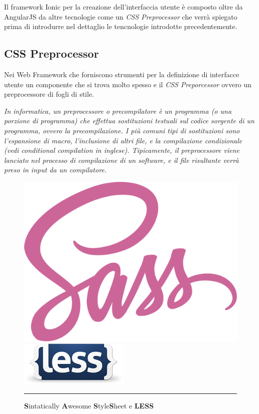 Il framework Ionic per la creazione dell'interfaccia utente è composto oltre da AngularJS da altre tecnologie come un \emph{CSS Preprocessor} che verrà spiegato prima di introdurre nel dettaglio le tencnologie introdotte precedentemente.

\subsection{CSS Preprocessor}

Nei Web Framework che forniscono strumenti per la definizione di interfacce utente un componente che si trova molto spesso e il \emph{CSS Preporcessor} ovvero un preprocessore di fogli di stile.

\emph{In informatica, un preprocessore o precompilatore è un programma (o una porzione di programma) che effettua sostituzioni testuali sul codice sorgente di un programma, ovvero la precompilazione. I più comuni tipi di sostituzioni sono l'espansione di macro, l'inclusione di altri file, e la compilazione condizionale (vedi conditional compilation in inglese). Tipicamente, il preprocessore viene lanciato nel processo di compilazione di un software, e il file risultante verrà preso in input da un compilatore.}
\hspace*{\fill}\cite{wiki:preprocessor} 

\begin{figure}[htbp]
  \centering
    \includegraphics[scale=0.25]{Figures/sass-logo.png} 
    \includegraphics[scale=0.75]{Figures/less-logo.png} 
    \rule{35em}{0.5pt}
  \caption[Css Preprocessors]{\textbf{S}intatically \textbf{A}wesome \textbf{S}tyle\textbf{S}heet e \textbf{LESS}}
  \label{fig:CSS Preprocessors}
\end{figure}



